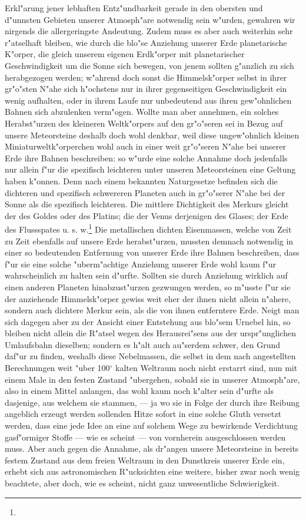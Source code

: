 \documentclass[a4paper, 8pt, oneside, polutonikogreek, german]{article}
\begin{document}
Erkl"arung jener lebhaften Entz"undbarkeit gerade in den obersten und d"unnsten Gebieten unserer Atmosph"are notwendig sein w"urden, gewahren wir nirgends die allergeringste Andeutung. Zudem muss es aber auch weiterhin sehr r"atselhaft bleiben, wie durch die blo"se Anziehung unserer Erde planetarische K"orper, die gleich unserem eigenen Erdk"orper mit planetarischer Geschwindigkeit um die Sonne sich bewegen, von jenem sollten g"anzlich zu sich herabgezogen werden; w"ahrend doch sonst die Himmelsk"orper selbst in ihrer gr"o"sten N"ahe sich h"ochstens nur in ihrer gegenseitigen Geschwindigkeit ein wenig aufhalten, oder in ihrem Laufe nur unbedeutend aus ihren gew"ohnlichen Bahnen sich abzulenken verm"ogen. Wollte man aber annehmen, ein solches Herabst"urzen des kleineren Weltk"orpers auf den gr"o"seren sei in Bezug auf unsere Meteorsteine deshalb doch wohl denkbar, weil diese ungew"ohnlich kleinen Miniaturweltk"orperchen wohl auch in einer weit gr"o"seren N"ahe bei unserer Erde ihre Bahnen beschreiben: so w"urde eine solche Annahme doch jedenfalls nur allein f"ur die spezifisch leichteren unter unseren Meteorsteinen eine Geltung haben k"onnen. Denn nach einem bekannten Naturgesetze befinden sich die dichteren und spezifisch schwereren Planeten auch in gr"o"serer N"ahe bei der Sonne als die spezifisch leichteren. Die mittlere Dichtigkeit des Merkurs gleicht der des Goldes oder des Platins; die der Venus derjenigen des Glases; der Erde des Flussspates u. s. w.\footnote{} Die metallischen dichten Eisenmassen, welche von Zeit zu Zeit ebenfalls auf unsere Erde herabst"urzen, mussten demnach notwendig in einer so bedeutenden Entfernung von unserer Erde ihre Bahnen beschreiben, dass f"ur sie eine solche "uberm"achtige Anziehung unserer Erde wohl kaum f"ur wahrscheinlich zu halten sein d"urfte. Sollten sie durch Anziehung wirklich auf einen anderen Planeten hinabzust"urzen gezwungen werden, so m"usste f"ur sie der anziehende Himmelsk"orper gewiss weit eher der ihnen nicht allein n"ahere, sondern auch dichtere Merkur sein, als die von ihnen entferntere Erde. Neigt man sich dagegen aber zu der Ansicht einer Entstehung aus blo"sem Urnebel hin, so bleiben nicht allein die R"atsel wegen des Herausrei"sens aus der urspr"unglichen Umlaufsbahn dieselben; sondern es h"alt auch au"serdem schwer, den Grund daf"ur zu finden, weshalb diese Nebelmassen, die selbst in dem nach angestellten Berechnungen weit "uber 100$^\circ$ kalten Weltraum noch nicht erstarrt sind, nun mit einem Male in den festen Zustand "ubergehen, sobald sie in unserer Atmosph"are, also in einem Mittel anlangen, das wohl kaum noch k"alter sein d"urfte als dasjenige, aus welchem sie stammen, --- ja wo sie in Folge der durch ihre Reibung angeblich erzeugt werden sollenden Hitze sofort in eine solche Gluth versetzt werden, dass eine jede Idee an eine auf solchem Wege zu bewirkende Verdichtung gasf"ormiger Stoffe --- wie es scheint --- von vornherein ausgeschlossen werden muss. Aber auch gegen die Annahme, als dr"angen unsere Meteorsteine in bereits festem Zustand aus dem freien Weltraum in den Dunstkreis unserer Erde ein, erhebt sich aus astronomischen R"ucksichten eine weitere, bisher zwar noch wenig beachtete, aber doch, wie es scheint, nicht ganz unwesentliche Schwierigkeit. 
\end{document}
